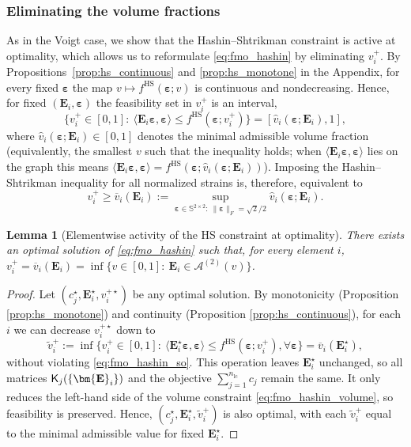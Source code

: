 \documentclass[preprint,3p]{elsarticle}
\newcommand{\tenss}[1]{\bm{\mathbf{#1}}}            %
\newcommand{\tensf}[1]{\bm{\mathbf{#1}}}            %
\newcommand{\strain}{\tenss{\varepsilon}}           %
\newcommand{\Ei}{\tensf{E}_i}                       %
\newcommand{\nlc}{n_\mathrm{lc}}                    %
\newcommand{\semtrx}[1]{\ifcat\noexpand#1\relax\bm{#1}\else\mathsf{#1}\fi}
\newtheorem{lemma}{Lemma}[section]
\begin{document}
\subsubsection{Eliminating the volume fractions}

As in the Voigt case, we show that the Hashin--Shtrikman constraint is active at optimality, which allows us to reformulate \eqref{eq:fmo_hashin} by eliminating $v_i^+$. By Propositions~\ref{prop:hs_continuous} and \ref{prop:hs_monotone} in the Appendix, for every fixed $\strain$ the map $v\mapsto f^{\mathrm{HS}}(\strain;v)$ is continuous and nondecreasing. Hence, for fixed $(\Ei,\strain)$ the feasibility set in $v_i^+$ is an interval,
%
\begin{equation}\label{eq:vi_interval}
\{v_i^+\in[0,1]:\ \langle \Ei\strain,\strain\rangle \le f^{\mathrm{HS}}(\strain;v_i^+)\}=[\hat{v}_i(\strain;\Ei),1],
\end{equation}
%
where $\hat{v}_i(\strain;\Ei)\in[0,1]$ denotes the minimal admissible volume fraction (equivalently, the smallest $v$ such that the inequality holds; when $\langle \Ei\strain,\strain\rangle$ lies on the graph this means $\langle \Ei\strain,\strain\rangle=f^{\mathrm{HS}}(\strain;\hat{v}_i(\strain;\Ei))$). Imposing the Hashin--Shtrikman inequality for all normalized strains is, therefore, equivalent to
%
\begin{equation}\label{eq:vi_plus_sup}
v_i^+ \ge \overline{v}_i(\Ei):=\sup_{\strain\in\mathbb{S}^{2\times2}:\ \lVert \strain \rVert_F=\sqrt{2}/2}\hat{v}_i(\strain;\Ei).
\end{equation}
%
\begin{lemma}[Elementwise activity of the HS constraint at optimality]\label{lem:HS_active}
There exists an optimal solution of \eqref{eq:fmo_hashin} such that, for every element $i$, $v_i^+ = \overline{v}_i(\Ei)=\inf\{v\in[0,1]:\ \Ei\in\mathcal A^{(2)}(v)\}$.
\end{lemma}

\begin{proof}
Let $(c_j^\star,\Ei^\star,v_i^{+\star})$ be any optimal solution. By monotonicity (Proposition \ref{prop:hs_monotone}) and continuity (Proposition \ref{prop:hs_continuous}), for each $i$ we can decrease $v_i^{+\star}$ down to
%
\begin{equation}
\widetilde v_i^+ := \inf\{v_i^+ \in [0,1]:\ \langle \Ei^\star \strain, \strain\rangle \le f^{\mathrm{HS}}(\strain;v_i^+), \forall \strain\}
= \overline{v}_i(\Ei^\star),
\end{equation}
%
without violating \eqref{eq:fmo_hashin_so}. This operation leaves $\Ei^\star$ unchanged, so all matrices $\semtrx{K}_j (\{\Ei\})$ and the objective $\sum_{j=1}^{\nlc} c_j$ remain the same. It only reduces the left-hand side of the volume constraint \eqref{eq:fmo_hashin_volume}, so feasibility is preserved. Hence, $\left(c_j^\star,\Ei^\star,\widetilde v_i^+\right)$ is also optimal, with each $\widetilde v_i^+$ equal to the minimal admissible value for fixed $\Ei^\star$.
\end{proof}
\end{document}
